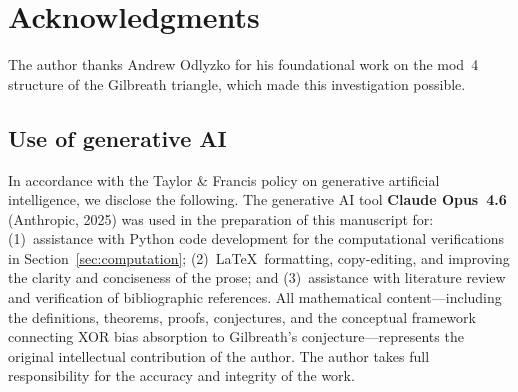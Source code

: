 \documentclass[11pt, a4paper]{amsart}
\theoremstyle{plain}
\theoremstyle{definition}
\begin{document}
\section*{Acknowledgments}

The author thanks Andrew Odlyzko for his foundational work on the mod~4 structure of the
Gilbreath triangle, which made this investigation possible.

\subsection*{Use of generative AI}
In accordance with the Taylor \& Francis policy on generative artificial intelligence,
we disclose the following. The generative AI tool \textbf{Claude Opus~4.6} (Anthropic, 2025)
was used in the preparation of this manuscript for: (1)~assistance with Python code development
for the computational verifications in Section~\ref{sec:computation}; (2)~\LaTeX\ formatting,
copy-editing, and improving the clarity and conciseness of the prose; and (3)~assistance with
literature review and verification of bibliographic references.
All mathematical content---including the definitions, theorems, proofs, conjectures, and the
conceptual framework connecting XOR bias absorption to Gilbreath's conjecture---represents the
original intellectual contribution of the author. The author takes full responsibility for the
accuracy and integrity of the work.
\end{document}
